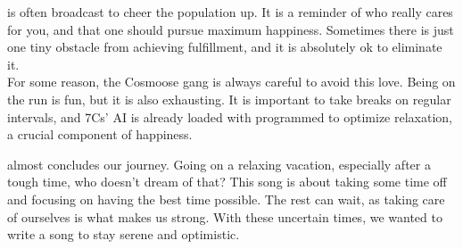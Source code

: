 
 is often broadcast to cheer the population up. It is a reminder of who really cares for you, and that one should pursue maximum happiness. Sometimes there is just one tiny obstacle from achieving fulfillment, and it is absolutely ok to eliminate it.\\

For some reason, the Cosmoose gang is always careful to avoid this love. 
Being on the run is fun, but it is also exhausting. 
It is important to take breaks on regular intervals, and 7Cs' AI is already loaded with programmed to optimize relaxation, a crucial component of happiness.

 almost concludes our journey. Going on a relaxing vacation, especially after a tough time, who doesn't dream of that? This song is about taking some time off and focusing on having the best time possible. The rest can wait, as taking care of ourselves is what makes us strong. With these uncertain times, we wanted to write a song to stay serene and optimistic.\\

\clearpage
